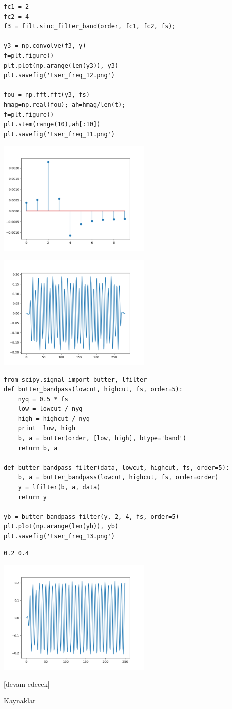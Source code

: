 \documentclass[12pt,fleqn]{article}\usepackage{../../common}
\begin{document}
\begin{verbatim}
fc1 = 2
fc2 = 4
f3 = filt.sinc_filter_band(order, fc1, fc2, fs);

y3 = np.convolve(f3, y)
f=plt.figure()
plt.plot(np.arange(len(y3)), y3)
plt.savefig('tser_freq_12.png')

fou = np.fft.fft(y3, fs)
hmag=np.real(fou); ah=hmag/len(t);
f=plt.figure()
plt.stem(range(10),ah[:10])
plt.savefig('tser_freq_11.png')
\end{verbatim}

\includegraphics[width=20em]{tser_freq_11.png}

\includegraphics[width=20em]{tser_freq_12.png}


\begin{verbatim}
from scipy.signal import butter, lfilter
def butter_bandpass(lowcut, highcut, fs, order=5):
    nyq = 0.5 * fs
    low = lowcut / nyq
    high = highcut / nyq
    print  low, high
    b, a = butter(order, [low, high], btype='band')
    return b, a

def butter_bandpass_filter(data, lowcut, highcut, fs, order=5):
    b, a = butter_bandpass(lowcut, highcut, fs, order=order)
    y = lfilter(b, a, data)
    return y

yb = butter_bandpass_filter(y, 2, 4, fs, order=5)
plt.plot(np.arange(len(yb)), yb)
plt.savefig('tser_freq_13.png')
\end{verbatim}

\begin{verbatim}
0.2 0.4
\end{verbatim}

\includegraphics[width=20em]{tser_freq_13.png}








[devam edecek]

Kaynaklar
\end{document}
